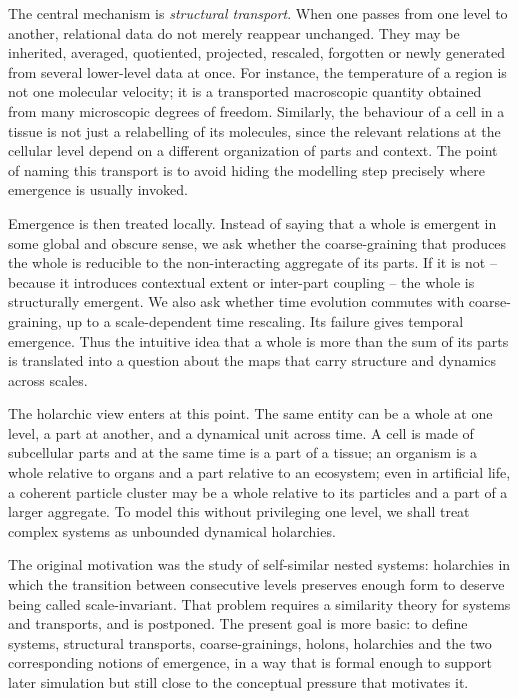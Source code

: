 \documentclass[runningheads]{llncs}
\begin{document}
The central mechanism is \emph{structural transport}. When one passes from one level to another, relational data do not merely reappear unchanged. They may be inherited, averaged, quotiented, projected, rescaled, forgotten or newly generated from several lower-level data at once. For instance, the temperature of a region is not one molecular velocity; it is a transported macroscopic quantity obtained from many microscopic degrees of freedom. Similarly, the behaviour of a cell in a tissue is not just a relabelling of its molecules, since the relevant relations at the cellular level depend on a different organization of parts and context. The point of naming this transport is to avoid hiding the modelling step precisely where emergence is usually invoked.

Emergence is then treated locally. Instead of saying that a whole is emergent in some global and obscure sense, we ask whether the coarse-graining that produces the whole is reducible to the non-interacting aggregate of its parts. If it is not -- because it introduces contextual extent or inter-part coupling -- the whole is structurally emergent. We also ask whether time evolution commutes with coarse-graining, up to a scale-dependent time rescaling. Its failure gives temporal emergence. Thus the intuitive idea that a whole is more than the sum of its parts is translated into a question about the maps that carry structure and dynamics across scales.

The holarchic view enters at this point. The same entity can be a whole at one level, a part at another, and a dynamical unit across time. A cell is made of subcellular parts and at the same time is a part of a tissue; an organism is a whole relative to organs and a part relative to an ecosystem; even in artificial life, a coherent particle cluster may be a whole relative to its particles and a part of a larger aggregate. To model this without privileging one level, we shall treat complex systems as unbounded dynamical holarchies.

The original motivation was the study of self-similar nested systems: holarchies in which the transition between consecutive levels preserves enough form to deserve being called scale-invariant. That problem requires a similarity theory for systems and transports, and is postponed. The present goal is more basic: to define systems, structural transports, coarse-grainings, holons, holarchies and the two corresponding notions of emergence, in a way that is formal enough to support later simulation but still close to the conceptual pressure that motivates it.
\end{document}
